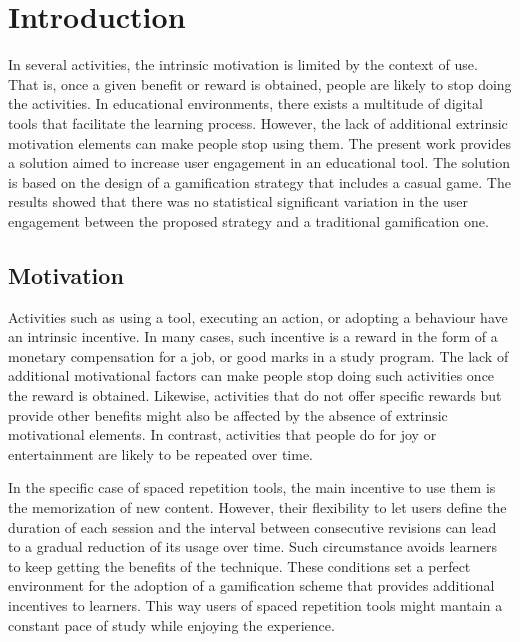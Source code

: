 
\chapter{Introduction} %

\label{intro} %


In several activities, the intrinsic motivation is limited by the context of use. That is, once a given benefit or reward is obtained, people are likely to stop doing the activities. In educational environments, there exists a multitude of digital tools that facilitate the learning process. However, the lack of additional extrinsic motivation elements can make people stop using them. The present work provides a solution aimed to increase user engagement in an educational tool. The solution is based on the design of a gamification strategy that includes a casual game. The results showed that there was no statistical significant variation in the user engagement between the proposed strategy and a traditional gamification one.

\section{Motivation}
Activities such as using a tool, executing an action, or adopting a behaviour have an intrinsic incentive. In many cases, such incentive is a reward in the form of a monetary compensation for a job, or good marks in a study program. The lack of additional motivational factors can make people stop doing such activities once the reward is obtained. Likewise, activities that do not offer specific rewards but provide other benefits might also be affected by the absence of extrinsic motivational elements. In contrast, activities that people do for joy or entertainment are likely to be repeated over time.

In the specific case of spaced repetition tools, the main incentive to use them is the memorization of new content. However, their flexibility to let users define the duration of each session and the interval between consecutive revisions can lead to a gradual reduction of its usage over time. Such circumstance avoids learners to keep getting the benefits of the technique. These conditions set a perfect environment for the adoption of a gamification scheme that provides additional incentives to learners. This way users of spaced repetition tools might mantain a constant pace of study while enjoying the experience.

